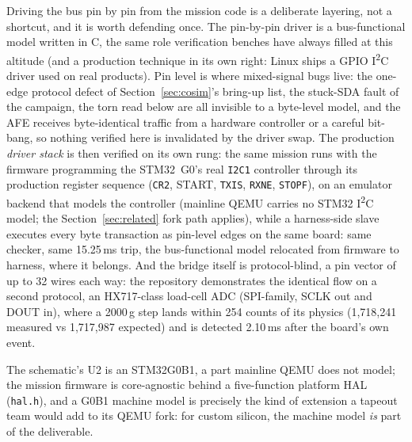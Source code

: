 \documentclass[11pt]{article}
\newcommand{\iic}{I\textsuperscript{2}C}
\begin{document}
Driving the bus pin by pin from the mission code is a deliberate
layering, not a shortcut, and it is worth defending once.  The
pin-by-pin driver is a bus-functional model written in C, the same
role verification benches have always filled at this altitude (and a
production technique in its own right: Linux ships a GPIO \iic{}
driver used on real products).  Pin level is where mixed-signal bugs
live: the one-edge protocol defect of Section~\ref{sec:cosim}'s
bring-up list, the stuck-SDA fault of the campaign, the torn read
below are all invisible to a byte-level model, and the AFE receives
byte-identical traffic from a hardware controller or a careful
bit-bang, so nothing verified here is invalidated by the driver
swap.  The production \emph{driver stack} is then verified on its
own rung: the same mission runs with the firmware programming the
STM32~G0's real \texttt{I2C1} controller through its production
register sequence (\texttt{CR2}, START, \texttt{TXIS},
\texttt{RXNE}, \texttt{STOPF}), on an emulator backend that models
the controller (mainline QEMU carries no STM32 \iic{} model; the
Section~\ref{sec:related} fork path applies), while a harness-side
slave executes every byte transaction as pin-level edges on the
same board: same checker, same 15.25\,ms trip, the bus-functional
model relocated from firmware to harness, where it belongs.  And
the bridge itself is protocol-blind, a pin vector of up to 32 wires
each way: the repository demonstrates the identical flow on a
second protocol, an HX717-class load-cell ADC (SPI-family, SCLK out
and DOUT in), where a 2000\,g step lands within 254 counts of its
physics (1{,}718{,}241 measured vs 1{,}717{,}987 expected) and is
detected 2.10\,ms after the board's own event.

The schematic's U2 is an
STM32G0B1, a part mainline QEMU does not model; the mission firmware
is core-agnostic behind a five-function platform HAL
(\texttt{hal.h}), and a G0B1 machine model is precisely the kind of
extension a tapeout team would add to its QEMU fork: for custom
silicon, the machine model \emph{is} part of the deliverable.
\end{document}
